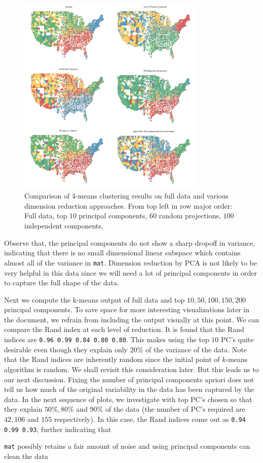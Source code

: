 \begin{figure}[ht]
	\centering
	\includegraphics[width=0.8\textwidth]{fig/plot2to6.png}
	\caption{Comparison of 4-means clustering results on full data and various dimension reduction approaches. From top left in row major order: Full data, top $10$ principal components, $60$ random projections, $100$ independent components,}
	\label{fig:allplots}
\end{figure}

Observe that, the principal components do not show a sharp dropoff in variance, indicating that there is no small dimensional linear subspace which contains almost all of the variance in \verb|mat|. Dimension reduction by PCA is not likely to be very helpful in this data since we will need a lot of principal components in order to capture the full shape of the data.

Next we compute the k-means output of full data and top $10, 50, 100, 150, 200$ principal components. To save space for more interesting visualizations later in the document, we refrain from including the output visually at this point. We can compare the Rand index at each level of reduction. It is found that the Rand indices are \verb|0.96 0.99 0.84 0.80 0.80|. This makes using the top $10$ PC's quite desirable even though they explain only $20\%$ of the variance of the data. Note that the Rand indices are inherently random since the initial point of $k$-means algorithm is random. We shall revisit this consideration later. But this leads us to our next discussion. Fixing the number of principal components apriori does not tell us how much of the original variability in the data has been captured by the data. In the next sequence of plots, we investigate with top PC's chosen so that they explain $50\%, 80\%$ and $90\%$ of the data (the number of PC's required are $42, 106$ and $155$ respectively). In this case, the Rand indices come out as \verb|0.94 0.99 0.93|, further indicating that
\begin{center}
\verb|mat| possibly retains a fair amount of noise and using principal components can clean the data
\end{center}

